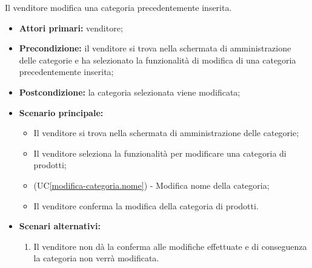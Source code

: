 Il venditore modifica una categoria precedentemente inserita.
\begin{itemize}
    \item \textbf{Attori primari:} venditore;
    \item \textbf{Precondizione:} il venditore si trova nella schermata di amministrazione delle categorie e ha selezionato la funzionalità di modifica di una categoria precedentemente inserita;
    \item \textbf{Postcondizione:} la categoria selezionata viene modificata;
    \item \textbf{Scenario principale:}
    \begin{itemize}
    	\item Il venditore si trova nella schermata di amministrazione delle categorie;
    	\item Il venditore seleziona la funzionalità per modificare una categoria di prodotti;
    	\item (UC\ref{modifica-categoria.nome}) - Modifica nome della categoria;
    	\item Il venditore conferma la modifica della categoria di prodotti.
    \end{itemize}
    \item \textbf{Scenari alternativi:} 
    \begin{enumerate}[label=\lett]
    	\item Il venditore non dà la conferma alle modifiche effettuate e di conseguenza la categoria non verrà modificata.
    \end{enumerate}
\end{itemize}

\label{modifica-categoria.nome}

